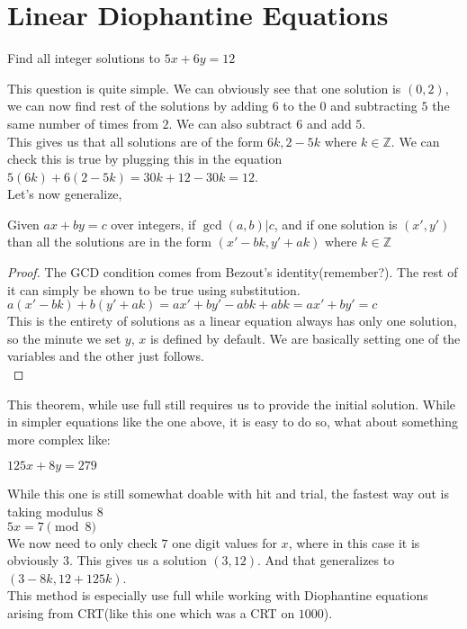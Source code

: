 \section{Linear Diophantine Equations}
\begin{example}
    Find all integer solutions to $5x+6y=12$
\end{example}
This question is quite simple. We can obviously see that one solution is $(0,2)$, we can now find rest of the solutions by adding $6$ to the $0$ and subtracting $5$ the same number of times from $2$. We can also subtract $6$ and add $5$.\\
This gives us that all solutions are of the form $6k, 2-5k$ where $k \in \mathbb{Z}$.  We can check this is true by plugging this in the equation $5(6k)+6(2-5k) = 30k+12-30k=12$.\\
Let's now generalize, \\
\begin{theorem}
    Given $ax+by=c$ over integers, if $\gcd(a,b)|c$, and if one solution is $(x',y')$ than all the solutions are in the form $(x'-bk, y'+ak)$ where $k \in \mathbb{Z}$
\end{theorem}
\begin{proof}
    The GCD condition comes from Bezout's identity(remember?). The rest of it can simply be shown to be true using substitution.\\
    $a(x'-bk)+b(y'+ak) = ax'+by'-abk+abk=ax'+by'=c$\\
    This is the entirety of solutions as a linear equation always has only one solution, so the minute we set $y$, $x$ is defined by default. We are basically setting one of the variables and the other just follows.\\
\end{proof}
This theorem, while use full still requires us to provide the initial solution. While in simpler equations like the one above, it is easy to do so, what about something more complex like:\\
\begin{example}
    $125x+8y=279$
\end{example}
While this one is still somewhat doable with hit and trial, the fastest way out is taking modulus $8$\\
$5x=7 \pmod{8}$\\
We now need to only check $7$ one digit values for $x$, where in this case it is obviously $3$. This gives us a solution $(3, 12)$. And that generalizes to $(3-8k, 12+125k)$.\\
This method is especially use full while working with Diophantine equations arising from CRT(like this one which was a CRT on $1000$).\\
